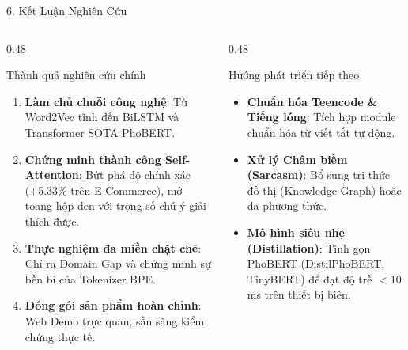 \documentclass[aspectratio=169, 10pt]{beamer}
\begin{document}
\begin{frame}{6. Kết Luận Nghiên Cứu}
  \begin{columns}[T, onlytextwidth]
    \begin{column}{0.48\textwidth}
      \begin{block}{Thành quả nghiên cứu chính}
        \fontsize{7.5}{9.5}\selectfont
        \begin{enumerate}\setlength{\itemsep}{0.15em}
          \item \textbf{Làm chủ chuỗi công nghệ}: Từ Word2Vec tĩnh đến BiLSTM và Transformer SOTA PhoBERT.
          \item \textbf{Chứng minh thành công Self-Attention}: Bứt phá độ chính xác (+5.33\% trên E-Commerce), mở toang hộp đen với trọng số chú ý giải thích được.
          \item \textbf{Thực nghiệm đa miền chặt chẽ}: Chỉ ra Domain Gap và chứng minh sự bền bỉ của Tokenizer BPE.
          \item \textbf{Đóng gói sản phẩm hoàn chỉnh}: Web Demo trực quan, sẵn sàng kiểm chứng thực tế.
        \end{enumerate}
      \end{block}
    \end{column}
    \hfill
    \begin{column}{0.48\textwidth}
      \begin{block}{Hướng phát triển tiếp theo}
        \fontsize{7.5}{9.5}\selectfont
        \begin{itemize}\setlength{\itemsep}{0.2em}
          \item \textbf{Chuẩn hóa Teencode \& Tiếng lóng}: Tích hợp module chuẩn hóa từ viết tắt tự động.
          \item \textbf{Xử lý Châm biếm (Sarcasm)}: Bổ sung tri thức đồ thị (Knowledge Graph) hoặc đa phương thức.
          \item \textbf{Mô hình siêu nhẹ (Distillation)}: Tinh gọn PhoBERT (DistilPhoBERT, TinyBERT) để đạt độ trễ $< 10$ms trên thiết bị biên.
        \end{itemize}
      \end{block}
    \end{column}
  \end{columns}
\end{frame}
\end{document}
